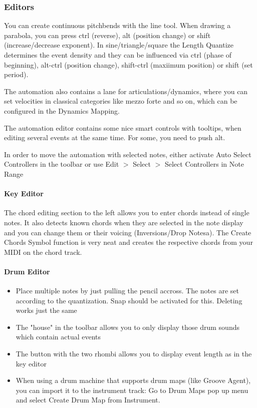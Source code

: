\documentclass[10pt]{article}
\begin{document}
\subsubsection{Editors}

You can create continuous pitchbends with the line tool. When drawing a parabola, you can press ctrl (reverse), alt (position change) or shift (increase/decrease exponent). In sine/triangle/square the Length Quantize determines the event density and they can be influenced via ctrl (phase of beginning), alt-ctrl (position change), shift-ctrl (maxiimum position) or shift (set period).

The automation also contains a lane for articulations/dynamics, where you can set velocities in classical categories like mezzo forte and so on, which can be configured in the Dynamics Mapping.

The automation editor contains some nice smart controls with tooltips, when editing several events at the same time. For some, you need to push alt.

In order to move the automation with selected notes, either activate Auto Select Controllers in the toolbar or use Edit $>$ Select $>$ Select Controllers in Note Range

\paragraph{Key Editor}

The chord editing section to the left allows you to enter chords instead of single notes. It also detects known chords when they are selected in the note display and you can change them or their voicing (Inversions/Drop Notesa). The Create Chords Symbol function is very neat and creates the respective chords from your MIDI on the chord track.

\paragraph{Drum Editor}

\begin{itemize}
	\item Place multiple notes by just pulling the pencil accross. The notes are set according to the quantization. Snap should be activated for this. Deleting works just the same
	\item The "house" in the toolbar allows you to only display those drum sounds which contain actual events
	\item The button with the two rhombi allows you to display event length as in the key editor
	\item When using a drum machine that supports drum maps (like Groove Agent), you can import it to the instrument track: Go to Drum Maps pop up menu and select Create Drum Map from Instrument.
\end{itemize}
\end{document}
